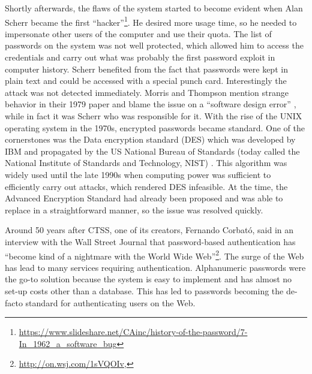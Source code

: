 Shortly afterwards, the flaws of the system started to become evident when Alan Scherr became the first ``hacker''\footnote{\url{https://www.slideshare.net/CAinc/history-of-the-password/7-In_1962_a_software_bug} }. He desired more usage time, so he needed to impersonate other users of the computer and use their quota. The list of passwords on the system was not well protected, which allowed him to access the credentials and carry out what was probably the first password exploit in computer history. Scherr benefited from the fact that passwords were kept in plain text and could be accessed with a special punch card. Interestingly the attack was not detected immediately. Morris and Thompson mention strange behavior in their 1979 paper and blame the issue on a ``software design error'' \cite{Morris1979PasswordSecurity}, while in fact it was Scherr who was responsible for it. 
With the rise of the UNIX operating system in the 1970s, encrypted passwords became standard. One of the cornerstones was the Data encryption standard (DES) which was developed by IBM and propagated by the US National Bureau of Standards (today called the National Institute of Standards and Technology, \gls{NIST}) \cite{Bishop1995ProactivePasswordChecking}. This algorithm was widely used until the late 1990s when computing power was sufficient to efficiently carry out attacks, which rendered DES infeasible. At the time, the Advanced Encryption Standard had already been proposed and was able to replace in a straightforward manner, so the issue was resolved quickly.%



Around 50 years after CTSS, one of its creators, Fernando Corbató, said in an interview with the Wall Street Journal that password-based authentication has ``become kind of a nightmare with the World Wide Web''\footnote{\label{foot:corbato_regrets}\url{http://on.wsj.com/1sVQOIv}, }. The surge of the Web has lead to many services requiring authentication. Alphanumeric passwords were the go-to solution because the system is easy to implement and has almost no set-up costs other than a database. This has led to passwords becoming the de-facto standard for authenticating users on the Web.

